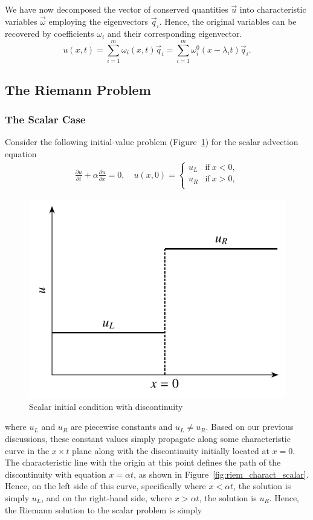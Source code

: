 We have now decomposed the vector of conserved quantities $\vec u$ into characteristic variables $\vec \omega$ employing the eigenvectors $\vec q_i$. Hence, the original variables can be recovered by coefficients $\omega_i$ and their corresponding eigenvector.
\begin{equation}
	u(x,t) = \sum_{i=1}^{m} \omega_i(x,t) \vec q_i=\sum_{i=1}^m \omega^0_i(x-\lambda_i t) \vec q_i.
	\label{eq:linsuperposition}
\end{equation}
\subsection{The Riemann Problem}
\subsubsection{The Scalar Case}
Consider the following initial-value problem (Figure~\ref{fig:scalar_riemann_u0}) for the scalar advection equation 
\begin{align}
	\frac{\partial u}{\partial t} + \alpha \frac{\partial u}{\partial x} = 0, \quad u(x,0) = 
	\begin{cases}
		u_L & \text{if}~x<0,\\
		u_R & \text{if}~x>0,\\
	\end{cases}
\end{align}
\begin{figure}[htbp]
	\centering
	\includegraphics[width=0.5\linewidth]{Pictures/riem_lsc_u0}
	\caption{Scalar initial condition with discontinuity}
	\label{fig:scalar_riemann_u0}
\end{figure}
where $u_L$ and $u_R$ are piecewise constants and $u_L\neq u_R$. Based on our previous discussions, these constant values simply propagate along some characteristic curve in the $x\times t$ plane along with the discontinuity initially located at $x=0$. The characteristic line with the origin at this point defines the path of the discontinuity with equation $x=\alpha t$, as shown in Figure~\ref{fig:riem_charact_scalar}. Hence, on the left side of this curve, specifically where $x<\alpha t$, the solution is simply $u_L$, and on the right-hand side, where $x>\alpha t$, the solution is $u_R$. Hence, the Riemann solution to the scalar problem is simply
